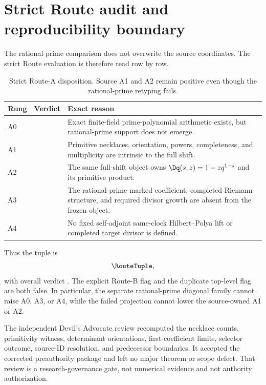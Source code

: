 \section{Strict Route audit and reproducibility boundary}
\label{sec:route}

The rational-prime comparison does not overwrite the source coordinates.
The strict Route evaluation is therefore read row by row.

\begin{table}[t]
\centering
\small
\caption{Strict Route-A disposition. Source A1 and A2 remain positive even
though the rational-prime retyping fails.}
\label{tab:route}
\begin{tabularx}{\textwidth}{@{}
  >{\raggedright\arraybackslash}p{}
  >{\raggedright\arraybackslash}p{}Y@{}}
\toprule
Rung & Verdict & Exact reason \\
\midrule
A0 & \newline{} & Exact finite-field prime-polynomial arithmetic exists, but rational-prime support does not emerge. \\
A1 &  & Primitive necklaces, orientation, powers, completeness, and multiplicity are intrinsic to the full shift. \\
A2 & \newline{} & The same full-shift object owns $\Dq(s,z)=1-zq^{1-s}$ and its primitive product. \\
A3 &  & The rational-prime marked coefficient, completed Riemann structure, and required divisor growth are absent from the frozen object. \\
A4 &  & No fixed self-adjoint same-clock Hilbert--Polya lift or completed target divisor is defined. \\
\bottomrule
\end{tabularx}
\end{table}

Thus the tuple is
\[
 \RouteTuple,
\]
with overall verdict . The explicit Route-B flag and
the duplicate top-level flag are both false. In particular, the separate
rational-prime diagonal family cannot raise A0, A3, or A4, while the failed
projection cannot lower the source-owned A1 or A2.

The independent Devil's Advocate review recomputed the necklace counts,
primitivity witness, determinant orientations, first-coefficient limits,
selector outcome, source-ID resolution, and predecessor boundaries. It
accepted the corrected preauthority package and left no major theorem or
scope defect. That review is a research-governance gate, not numerical
evidence and not authority authorization.

